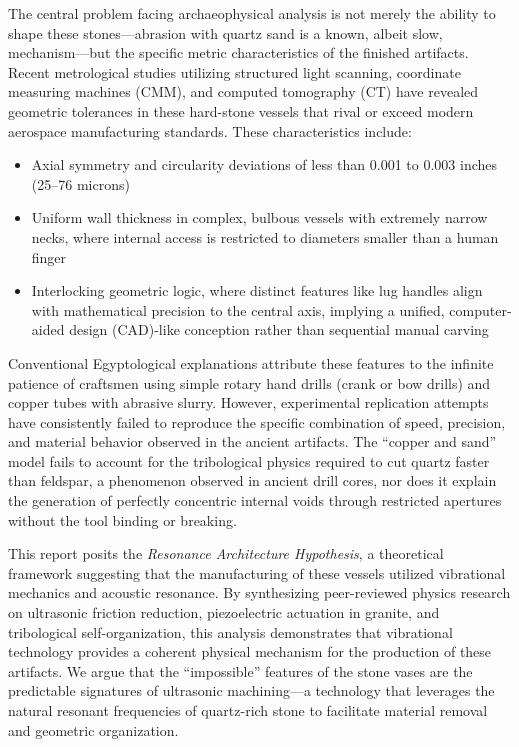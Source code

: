 \documentclass[11pt]{article}
\begin{document}
The central problem facing archaeophysical analysis is not merely the ability to shape these stones---abrasion with quartz sand is a known, albeit slow, mechanism---but the specific metric characteristics of the finished artifacts. Recent metrological studies utilizing structured light scanning, coordinate measuring machines (CMM), and computed tomography (CT) have revealed geometric tolerances in these hard-stone vessels that rival or exceed modern aerospace manufacturing standards. These characteristics include:

\begin{itemize}
    \item Axial symmetry and circularity deviations of less than 0.001 to 0.003 inches (25--76 microns)
    \item Uniform wall thickness in complex, bulbous vessels with extremely narrow necks, where internal access is restricted to diameters smaller than a human finger
    \item Interlocking geometric logic, where distinct features like lug handles align with mathematical precision to the central axis, implying a unified, computer-aided design (CAD)-like conception rather than sequential manual carving
\end{itemize}

Conventional Egyptological explanations attribute these features to the infinite patience of craftsmen using simple rotary hand drills (crank or bow drills) and copper tubes with abrasive slurry. However, experimental replication attempts have consistently failed to reproduce the specific combination of speed, precision, and material behavior observed in the ancient artifacts. The ``copper and sand'' model fails to account for the tribological physics required to cut quartz faster than feldspar, a phenomenon observed in ancient drill cores, nor does it explain the generation of perfectly concentric internal voids through restricted apertures without the tool binding or breaking.

This report posits the \textit{Resonance Architecture Hypothesis}, a theoretical framework suggesting that the manufacturing of these vessels utilized vibrational mechanics and acoustic resonance. By synthesizing peer-reviewed physics research on ultrasonic friction reduction, piezoelectric actuation in granite, and tribological self-organization, this analysis demonstrates that vibrational technology provides a coherent physical mechanism for the production of these artifacts. We argue that the ``impossible'' features of the stone vases are the predictable signatures of ultrasonic machining---a technology that leverages the natural resonant frequencies of quartz-rich stone to facilitate material removal and geometric organization.
\end{document}
